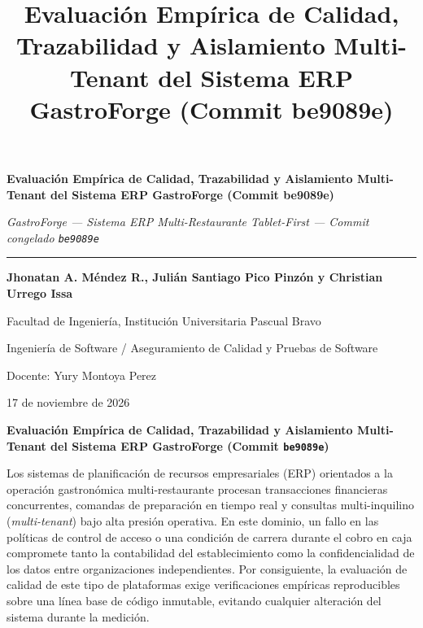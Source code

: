 \documentclass[stu,12pt,a4paper]{apa7}
\title{Evaluación Empírica de Calidad, Trazabilidad y Aislamiento Multi-Tenant del Sistema ERP GastroForge (Commit be9089e)}
\begin{document}
\begin{center}
\vspace*{1.4cm}
{\Large\bfseries\color{gfaccent} Evaluación Empírica de Calidad, Trazabilidad y Aislamiento Multi-Tenant del Sistema ERP GastroForge (Commit be9089e)\par}
\vspace{0.4cm}
{\normalsize\textit{GastroForge --- Sistema ERP Multi-Restaurante Tablet-First --- Commit congelado \texttt{be9089e}}\par}
\vspace{0.7cm}
{\color{gfaccent}\rule{0.45\linewidth}{0.6pt}\par}
\vspace{1.1cm}
{\normalsize\bfseries Jhonatan A. Méndez R., Julián Santiago Pico Pinzón y Christian Urrego Issa\par}
\vspace{0.6cm}
{\normalsize Facultad de Ingeniería, Institución Universitaria Pascual Bravo\par}
\vspace{0.35cm}
{\normalsize Ingeniería de Software / Aseguramiento de Calidad y Pruebas de Software\par}
\vspace{0.35cm}
{\normalsize Docente: Yury Montoya Perez\par}
\vspace{0.35cm}
{\normalsize 17 de noviembre de 2026\par}
\end{center}
\newpage
{\hypersetup{linkcolor=black}
\renewcommand{\contentsname}{Contenido}
\tableofcontents}
\clearpage

\begin{center}\textbf{Evaluación Empírica de Calidad, Trazabilidad y Aislamiento Multi-Tenant del Sistema ERP GastroForge (Commit \texttt{be9089e})}\end{center}

Los sistemas de planificación de recursos empresariales (ERP) orientados a la operación gastronómica multi-restaurante procesan transacciones financieras concurrentes, comandas de preparación en tiempo real y consultas multi-inquilino (\emph{multi-tenant}) bajo alta presión operativa. En este dominio, un fallo en las políticas de control de acceso o una condición de carrera durante el cobro en caja compromete tanto la contabilidad del establecimiento como la confidencialidad de los datos entre organizaciones independientes. Por consiguiente, la evaluación de calidad de este tipo de plataformas exige verificaciones empíricas reproducibles sobre una línea base de código inmutable, evitando cualquier alteración del sistema durante la medición.
\end{document}
